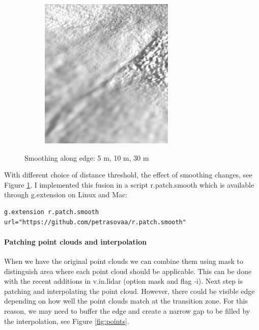 \documentclass[a4paper,10pt]{article}
\begin{document}
\begin{figure}[bc]
\begin{subfigure}[b]{0.33\textwidth}
	\end{subfigure}\hfill%
	\begin{subfigure}[b]{0.33\textwidth}
 		\includegraphics[width=\textwidth]{img/sm3}
	\end{subfigure}\hfill%
	\caption{Smoothing along edge: 5 m, 10 m, 30 m}
	\label{fig:smoothing}
\end{figure}

With different choice of distance threshold, the effect of smoothing changes,
see Figure \ref{fig:smoothing}. I implemented 
this fusion in a script r.patch.smooth which is available through g.extension on Linux and Mac:

{\small
\begin{verbatim}
g.extension r.patch.smooth url="https://github.com/petrasovaa/r.patch.smooth"
\end{verbatim}}


\paragraph*{Patching point clouds and interpolation}
When we have the original point clouds we can combine them using mask to distinguish
area where each point cloud should be applicable. This can be done with 
the recent additions in v.in.lidar (option mask and flag -i).
Next step is patching and interpolating the point cloud.
However, there could be visible edge depending on how well the point clouds match at the transition zone.
For this reason, we may need to buffer the edge and create
a narrow gap to be filled by the interpolation, see Figure \ref{fig:points}.
\end{document}
